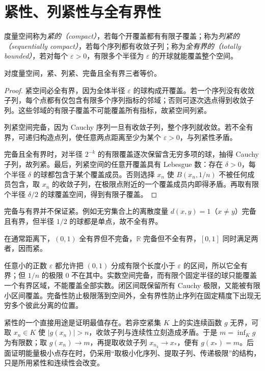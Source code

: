 \section{紧性、列紧性与全有界性}
\begin{definition}
度量空间称为\emph{紧的（compact）}，若每个开覆盖都有有限子覆盖；称为\emph{列紧的（sequentially compact）}，若每个序列都有收敛子列；称为\emph{全有界的（totally bounded）}，若对每个 $\varepsilon>0$，有限多个半径为 $\varepsilon$ 的开球就能覆盖整个空间。
\end{definition}
\begin{theorem}\label{thm:fa-metric-compactness}
对度量空间，紧、列紧、完备且全有界三者等价。
\end{theorem}
\begin{proof}
紧空间必全有界，因为全体半径 $\varepsilon$ 的球构成开覆盖。若一个序列没有收敛子列，每个点都有仅包含有限多个序列指标的邻域；否则可逐次选点得到收敛子列。这些邻域的有限子覆盖不可能覆盖所有指标，故紧空间列紧。

列紧空间完备，因为 Cauchy 序列一旦有收敛子列，整个序列就收敛。若不全有界，可递归构造点列，使任意两点距离至少为某个 $\varepsilon>0$，与列紧性矛盾。

完备且全有界时，对半径 $2^{-k}$ 的有限覆盖逐次保留含无穷多项的球，抽得 Cauchy 子列，故列紧。最后，列紧空间的任意开覆盖具有 Lebesgue 数：存在 $\delta>0$，每个半径 $\delta$ 的球都包含于某个覆盖成员。否则选择 $x_n$ 使 $B(x_n,1/n)$ 不被任何成员包含，取 $x_n$ 的收敛子列，在极限点附近的一个覆盖成员内即得矛盾。再取有限个半径 $\delta/2$ 的球覆盖空间，得到有限子覆盖。
\end{proof}
完备与有界并不保证紧。例如无穷集合上的离散度量 $d(x,y)=1$（$x\ne y$）完备且有界，但半径 $1/2$ 的球都是单点，故不全有界。

\begin{example}[三种条件分别控制什么]
在通常距离下，$(0,1)$ 全有界但不完备，$\mathbb R$ 完备但不全有界，$[0,1]$ 同时满足两者，因而紧。
\end{example}
\begin{solve}
任意小的正数 $\varepsilon$ 都允许把 $(0,1)$ 分成有限个长度小于 $\varepsilon$ 的区间，所以它全有界；但 $1/n$ 的极限 $0$ 不在其中。实数空间完备，而有限个固定半径的球只能覆盖一个有界区域，不能覆盖全部实数。闭区间既保留所有 Cauchy 极限，又能被有限小区间覆盖。完备性防止极限落到空间外，全有界性防止序列在固定精度下出现无穷多个彼此分离的位置。
\end{solve}

紧性的一个直接用途是证明最值存在。若非空紧集 $K$ 上的实连续函数 $g$ 无界，可取 $x_n\in K$ 使 $|g(x_n)|>n$，收敛子列与连续性立刻造成矛盾。于是 $m=\inf_Kg$ 为有限数；取 $g(x_n)\to m$，再提取收敛子列 $x_{n_k}\to x_*$，便有 $g(x_*)=m$。后面证明能量极小点存在时，仍采用“取极小化序列、提取子列、传递极限”的结构，只是所用紧性和连续性会改变。

